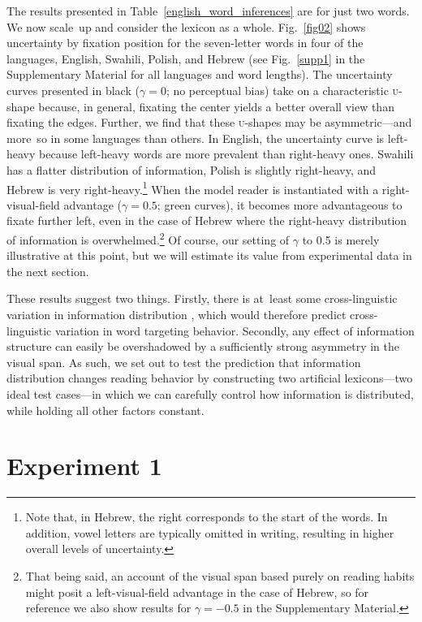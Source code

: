 \documentclass[doc,biblatex,floatsintext]{apa7}
\begin{document}
The results presented in Table~\ref{english_word_inferences} are for just two words. We now scale~up and consider the lexicon as a whole. Fig.~\ref{fig02} shows uncertainty by fixation position for the seven-letter words in four of the languages, English, Swahili, Polish, and Hebrew (see Fig.~\ref{supp1} in the Supplementary Material for all languages and word lengths). The uncertainty curves presented in black ($\gamma = 0$; no perceptual bias) take on a characteristic \textsc{u}-shape because, in general, fixating the center yields a better overall view than fixating the edges. Further, we find that these \textsc{u}-shapes may be asymmetric---and more~so in some languages than others. In English, the uncertainty curve is left-heavy because left-heavy words are more prevalent than right-heavy ones. Swahili has a flatter distribution of information, Polish is slightly right-heavy, and Hebrew is very right-heavy.\footnote{Note that, in Hebrew, the right corresponds to the start of the words. In addition, vowel letters are typically omitted in writing, resulting in higher overall levels of uncertainty.} When the model reader is instantiated with a right-visual-field advantage ($\gamma = 0.5$; green curves), it becomes more advantageous to fixate further left, even in the case of Hebrew where the right-heavy distribution of information is overwhelmed.\footnote{That being said, an account of the visual span based purely on reading habits might posit a left-visual-field advantage in the case of Hebrew, so for reference we also show results for $\gamma = -0.5$ in the Supplementary Material.} Of course, our setting of $\gamma$ to 0.5 is merely illustrative at this point, but we will estimate its value from experimental data in the next section.

These results suggest two things. Firstly, there is at~least some cross-linguistic variation in information distribution \parencite[see also][]{Shafir:2022}, which would therefore predict cross-linguistic variation in word targeting behavior. Secondly, any effect of information structure can easily be overshadowed by a sufficiently strong asymmetry in the visual span. As such, we set out to test the prediction that information distribution changes reading behavior by constructing two artificial lexicons---two ideal test cases---in which we can carefully control how information is distributed, while holding all other factors constant.

\section{Experiment 1}
\end{document}
